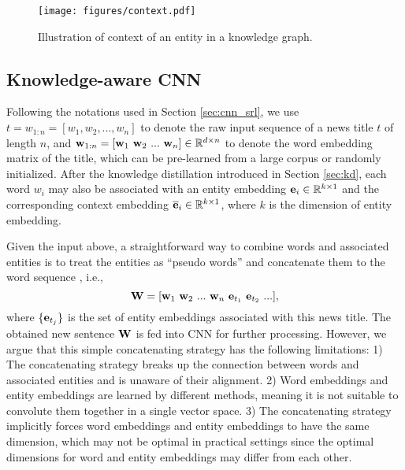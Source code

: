 \documentclass[sigconf]{acmart}
\begin{document}
		\begin{figure}[t]
			\centering
  			\texttt{[image: figures/context.pdf]}
  			\caption{Illustration of context of an entity in a knowledge graph.}
  			\label{fig:context}
		\end{figure}
		
		
	\subsection{Knowledge-aware CNN}
	\label{sec:kcnn}
		Following the notations used in Section \ref{sec:cnn_srl}, we use $t = w_{1:n} = [w_1, w_2, ..., w_n]$ to denote the raw input sequence of a news title $t$ of length $n$, and ${\bf w}_{1:n} = [{\bf w}_1 \ {\bf w}_2 \ ... \ {\bf w}_n] \in \mathbb R^{d \times n}$ to denote the word embedding matrix of the title, which can be pre-learned from a large corpus or randomly initialized.
		After the knowledge distillation introduced in Section \ref{sec:kd}, each word $w_i$ may also be associated with an entity embedding ${\bf e}_i \in \mathbb R^{k \times 1}$ and the corresponding context embedding $\overline {\bf e}_i  \in \mathbb R^{k \times 1}$, where $k$ is the dimension of entity embedding.
		
		Given the input above, a straightforward way to combine words and associated entities is to treat the entities as ``pseudo words'' and concatenate them to the word sequence \cite{wang2017combining}, i.e.,
		\begin{equation}
			{\bf W} = [{\bf w}_1 \ {\bf w}_2 \ ... \ {\bf w}_n \ {\bf e}_{t_1} \ {\bf e}_{t_2} \ ...],
		\end{equation}
		where $\{ {\bf e}_{t_j} \}$ is the set of entity embeddings associated with this news title.
		The obtained new sentence $\bf W$ is fed into CNN \cite{kim2014convolutional} for further processing.
		However, we argue that this simple concatenating strategy has the following limitations:
		1) The concatenating strategy breaks up the connection between words and associated entities and is unaware of their alignment.
		2) Word embeddings and entity embeddings are learned by different methods, meaning it is not suitable to convolute them together in a single vector space.
		3) The concatenating strategy implicitly forces word embeddings and entity embeddings to have the same dimension, which may not be optimal in practical settings since the optimal dimensions for word  and entity embeddings may differ from each other.
		
\end{document}
